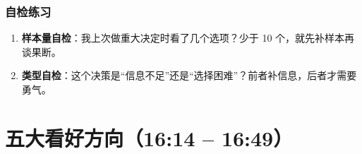 \subsubsection{自检练习}

\begin{enumerate}
\def\labelenumi{\arabic{enumi}.}
\tightlist
\item
  \textbf{样本量自检}：我上次做重大决定时看了几个选项？少于 10
  个，就先补样本再谈果断。
\item
  \textbf{类型自检}：这个决策是``信息不足''还是``选择困难''？前者补信息，后者才需要勇气。
\end{enumerate}

\section{五大看好方向（16:14 --
16:49）}

